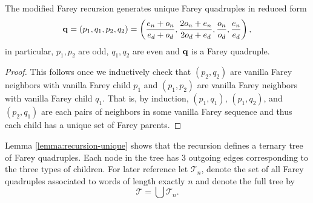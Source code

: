 \documentclass[12pt]{amsart}
\begin{document}

\begin{lemma} \label{lemma:recursion-unique} 
	The modified Farey recursion generates unique Farey quadruples in reduced form 
	\[
	\mathbf{q} = (p_1, q_1, p_2,q_2) =  \left( \frac{e_n+o_n}{e_d+o_d}, \frac{2 o_n + e_n}{2 o_d + e_d}, \frac{o_n}{o_d}, \frac{e_n}{e_d} \right), 
	\]
	in particular, $p_1,p_2$ are odd, $q_1, q_2$ are even and $\mathbf{q}$ is a Farey quadruple. 
\end{lemma}
\begin{proof}
	This follows once we inductively check that $(p_2, q_2)$ are vanilla Farey neighbors with vanilla Farey child $p_1$ and 
	$(p_1, p_2)$ are vanilla Farey neighbors with vanilla Farey child $q_1$. That is, by induction,
	$(p_1, q_1)$, $(p_1, q_2)$, and $(p_2, q_1)$ are each pairs of neighbors in some vanilla Farey sequence
	and thus each child has a unique set of Farey parents. 
\end{proof}



Lemma \ref{lemma:recursion-unique} shows that the recursion defines a ternary tree of Farey quadruples. 
Each node in the tree has 3 outgoing edges corresponding to the three types of children. For later reference let $\mathcal{T}_n$, 
denote the set of all Farey quadruples associated to words of length exactly $n$ and denote the full tree by 
\begin{equation} \label{eq:full_farey_tree}
\mathcal{T} = \bigcup \mathcal{T}_n .
\end{equation}
\end{document}
